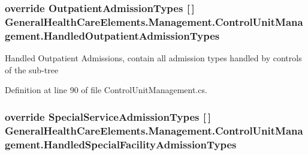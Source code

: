 \subsubsection[{\texorpdfstring{Handled\+Outpatient\+Admission\+Types}{HandledOutpatientAdmissionTypes}}]{\setlength{\rightskip}{0pt plus 5cm}override {\bf Outpatient\+Admission\+Types} \mbox{[}$\,$\mbox{]} General\+Health\+Care\+Elements.\+Management.\+Control\+Unit\+Management.\+Handled\+Outpatient\+Admission\+Types\hspace{0.3cm}{\ttfamily [get]}}\hypertarget{class_general_health_care_elements_1_1_management_1_1_control_unit_management_ad85ed230f37f23b3d50d25e9a93b9d58}{}\label{class_general_health_care_elements_1_1_management_1_1_control_unit_management_ad85ed230f37f23b3d50d25e9a93b9d58}


Handled Outpatient Admissions, contain all admission types handled by controls of the sub-\/tree 



Definition at line 90 of file Control\+Unit\+Management.\+cs.

\subsubsection[{\texorpdfstring{Handled\+Special\+Facility\+Admission\+Types}{HandledSpecialFacilityAdmissionTypes}}]{\setlength{\rightskip}{0pt plus 5cm}override {\bf Special\+Service\+Admission\+Types} \mbox{[}$\,$\mbox{]} General\+Health\+Care\+Elements.\+Management.\+Control\+Unit\+Management.\+Handled\+Special\+Facility\+Admission\+Types\hspace{0.3cm}{\ttfamily [get]}}\hypertarget{class_general_health_care_elements_1_1_management_1_1_control_unit_management_a3e663125bcba357ae48eb2014f67a95e}{}\label{class_general_health_care_elements_1_1_management_1_1_control_unit_management_a3e663125bcba357ae48eb2014f67a95e}


